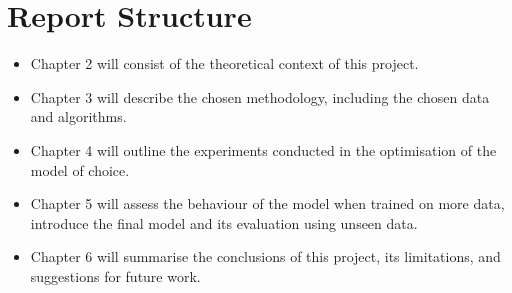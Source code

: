 \section{Report Structure} \label{report_struct}
\begin{itemize}
    \item Chapter 2 will consist of the theoretical context of this project. 
    \item Chapter 3 will describe the chosen methodology, including the chosen data and algorithms. 
    \item Chapter 4 will outline the experiments conducted in the optimisation of the model of choice.
    \item Chapter 5 will assess the behaviour of the model when trained on more data, introduce the final model and its evaluation using unseen data.
    \item Chapter 6  will summarise the conclusions of this project, its limitations, and suggestions for future work.
\end{itemize}